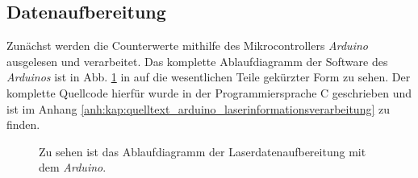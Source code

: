 \subsection{Datenaufbereitung}\label{subsec:datenaufbereitung}
Zunächst werden die Counterwerte mithilfe des Mikrocontrollers \textit{Arduino}
ausgelesen und verarbeitet. Das komplette Ablaufdiagramm der Software des
\textit{Arduinos} ist in Abb. \ref{fig:ablaufdiagramm_arduino_laser} in auf die
wesentlichen Teile gekürzter Form zu sehen. Der komplette Quellcode hierfür
wurde in der Programmiersprache C geschrieben und ist im Anhang
\ref{anh:kap:quelltext_arduino_laserinformationsverarbeitung} zu finden.
\begin{figure}[hp]
 	\centering
	\caption[Laserdatenaufbereitung -
	Ablaufdiagramm]{Zu sehen ist das Ablaufdiagramm der
	Laserdatenaufbereitung mit dem
	\textit{Arduino}.}\label{fig:ablaufdiagramm_arduino_laser}
\end{figure}
